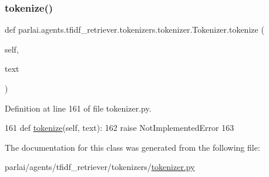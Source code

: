 \subsubsection{\texorpdfstring{tokenize()}{tokenize()}}
{\footnotesize\ttfamily def parlai.\+agents.\+tfidf\+\_\+retriever.\+tokenizers.\+tokenizer.\+Tokenizer.\+tokenize (\begin{DoxyParamCaption}\item[{}]{self,  }\item[{}]{text }\end{DoxyParamCaption})}



Definition at line 161 of file tokenizer.\+py.


\begin{DoxyCode}
161     \textcolor{keyword}{def }\hyperlink{namespaceparlai_1_1agents_1_1tfidf__retriever_1_1build__tfidf_a1fdb457e98eb4e4c26047e229686a616}{tokenize}(self, text):
162         \textcolor{keywordflow}{raise} NotImplementedError
163 
\end{DoxyCode}


The documentation for this class was generated from the following file\+:\begin{DoxyCompactItemize}
\item 
parlai/agents/tfidf\+\_\+retriever/tokenizers/\hyperlink{tokenizer_8py}{tokenizer.\+py}\end{DoxyCompactItemize}
